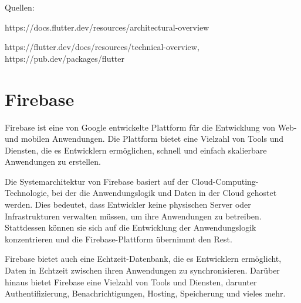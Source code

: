 
Quellen:

https://docs.flutter.dev/resources/architectural-overview

https://flutter.dev/docs/resources/technical-overview,
https://pub.dev/packages/flutter







\section{Firebase}
Firebase\cite{firebase} ist eine von Google entwickelte Plattform für die Entwicklung von Web- und mobilen Anwendungen. Die Plattform bietet eine Vielzahl von Tools und Diensten, die es Entwicklern ermöglichen, schnell und einfach skalierbare Anwendungen zu erstellen.

Die Systemarchitektur von Firebase basiert auf der Cloud-Computing-Technologie, bei der die Anwendungslogik und Daten in der Cloud gehostet werden. Dies bedeutet, dass Entwickler keine physischen Server oder Infrastrukturen verwalten müssen, um ihre Anwendungen zu betreiben. Stattdessen können sie sich auf die Entwicklung der Anwendungslogik konzentrieren und die Firebase-Plattform übernimmt den Rest.

Firebase bietet auch eine Echtzeit-Datenbank, die es Entwicklern ermöglicht, Daten in Echtzeit zwischen ihren Anwendungen zu synchronisieren. Darüber hinaus bietet Firebase eine Vielzahl von Tools und Diensten, darunter Authentifizierung, Benachrichtigungen, Hosting, Speicherung und vieles mehr.

